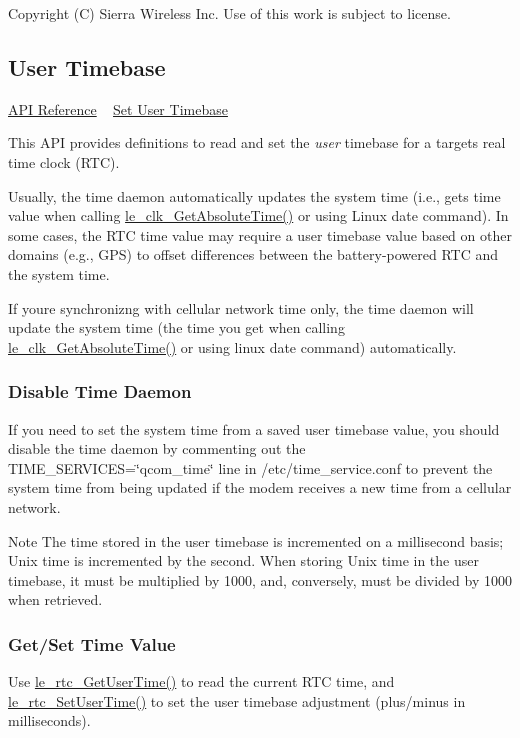 Copyright (C) Sierra Wireless Inc. Use of this work is subject to license. \hypertarget{c_rtc}{}\subsection{User Timebase}\label{c_rtc}
\hyperlink{le__rtc__interface_8h}{A\+P\+I Reference} ~\newline
 \hyperlink{howToSetUserTimebase}{Set User Timebase} 



This A\+P\+I provides definitions to read and set the {\itshape user} timebase for a target\textquotesingle{}s real time clock (R\+T\+C).

Usually, the time daemon automatically updates the system time (i.\+e., gets time value when calling \hyperlink{le__clock_8h_a33197dbd676a37b8c4d5de8f93edc1ee}{le\+\_\+clk\+\_\+\+Get\+Absolute\+Time()} or using Linux {\ttfamily date} command). In some cases, the R\+T\+C time value may require a user timebase value based on other domains (e.\+g., G\+P\+S) to offset differences between the battery-\/powered R\+T\+C and the system time.

If you\textquotesingle{}re synchronizng with cellular network time only, the time daemon will update the system time (the time you get when calling \hyperlink{le__clock_8h_a33197dbd676a37b8c4d5de8f93edc1ee}{le\+\_\+clk\+\_\+\+Get\+Absolute\+Time()} or using linux \textquotesingle{}date\textquotesingle{} command) automatically.\hypertarget{c_rtc_c_rtc_disableDaemon}{}\subsubsection{Disable Time Daemon}\label{c_rtc_c_rtc_disableDaemon}
If you need to set the system time from a saved user timebase value, you should disable the time daemon by commenting out the {\ttfamily T\+I\+M\+E\+\_\+\+S\+E\+R\+V\+I\+C\+E\+S=\char`\"{}qcom\+\_\+time\char`\"{}} line in {\ttfamily /etc/time\+\_\+service}.conf to prevent the system time from being updated if the modem receives a new time from a cellular network.

\begin{DoxyNote}{Note}
The time stored in the user timebase is incremented on a millisecond basis; Unix time is incremented by the second. When storing Unix time in the user timebase, it must be multiplied by 1000, and, conversely, must be divided by 1000 when retrieved.
\end{DoxyNote}
\hypertarget{c_rtc_c_rtc_getSet}{}\subsubsection{Get/\+Set Time Value}\label{c_rtc_c_rtc_getSet}
Use \hyperlink{le__rtc__interface_8h_a1819b745bbef6d340305ce07b9b7ce2f}{le\+\_\+rtc\+\_\+\+Get\+User\+Time()} to read the current R\+T\+C time, and \hyperlink{le__rtc__interface_8h_a6d4e09df04dfb0c8a8e1386030bdf83c}{le\+\_\+rtc\+\_\+\+Set\+User\+Time()} to set the user timebase adjustment (plus/minus in milliseconds).





